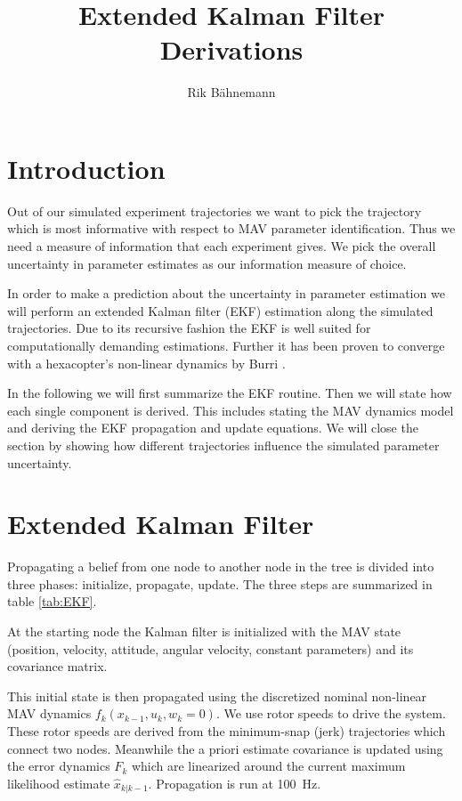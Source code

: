 \documentclass[10pt,a4paper]{article}
\title{Extended Kalman Filter Derivations}
\author{Rik Bähnemann}
\begin{document}
\maketitle
\section{Introduction}
Out of our simulated experiment trajectories we want to pick the trajectory which is most informative with respect to MAV parameter identification. Thus we need a measure of information that each experiment gives. We pick the overall uncertainty in parameter estimates as our information measure of choice. 

In order to make a prediction about the uncertainty in parameter estimation we will perform an extended Kalman filter (EKF) estimation along the simulated trajectories. Due to its recursive fashion the EKF is well suited for computationally demanding estimations. Further it has been proven to converge with a hexacopter's non-linear dynamics by Burri \cite{burri2015robust}.

In the following we will first summarize the EKF routine. Then we will state how each single component is derived. This includes stating the MAV dynamics model and deriving the EKF propagation and update equations. We will close the section by showing how different trajectories influence the simulated parameter uncertainty.

\section{Extended Kalman Filter}
Propagating a belief from one node to another node in the tree is divided into three phases: initialize, propagate, update. The three steps are summarized in table \ref{tab:EKF}.

At the starting node the Kalman filter is initialized with the MAV state (position, velocity, attitude, angular velocity, constant parameters) and its covariance matrix.

This initial state is then propagated using the discretized nominal non-linear MAV dynamics $f_k(x_{k-1}, u_k, w_k=0)$. We use rotor speeds to drive the system. These rotor speeds are derived from the minimum-snap (jerk) trajectories which connect two nodes. Meanwhile the a priori estimate covariance is updated using the error dynamics $F_k$ which are linearized around the current maximum likelihood estimate $\hat{x}_{k|k-1}$. Propagation is run at \SI{100}{\hertz}.
\end{document}
